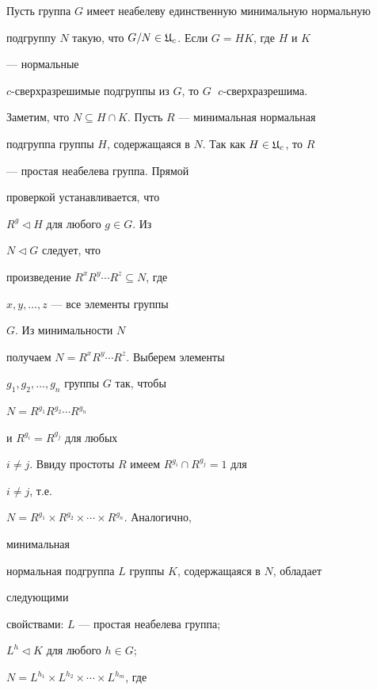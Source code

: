 \begin{lem}


Пусть группа $G$ имеет неабелеву единственную минимальную нормальную


подгруппу $N$ такую, что $G/N\in\frak U_c$. Если $G=HK$, где $H$ и $K$


--- нормальные


$c$-сверхразрешимые подгруппы из $G$, то $G\;$ $c$-сверхразрешима.


\end{lem}





\begin{pf}


Заметим, что $N\subseteq H\cap K$. Пусть $R$ --- минимальная нормальная


подгруппа группы $H$, содержащаяся в $N$. Так как $H\in\frak U_c$, то $R$


--- простая неабелева группа. Прямой


проверкой устанавливается, что


$R^g\vartriangleleft H$ для любого $g\in G$. Из


$N\vartriangleleft G$ следует, что


произведение $R^xR^y\dotsb R^z\subseteq N$, где


$x,y,\dotsc,z$ --- все элементы группы


$G$. Из минимальности $N$


получаем $N=R^xR^y\dotsb R^z$. Выберем элементы


$g_1,g_2,\dotsc,g_n$ группы $G$ так, чтобы


$N=R^{g_1}R^{g_2}\dotsb R^{g_n}$


и $R^{g_i}=R^{g_j}$ для любых


$i\ne j$. Ввиду простоты $R$ имеем $R^{g_i}\cap R^{g_j}=1$ для


$i\ne j$, т.е.


$N=R^{g_1}\times R^{g_2}\times\dotsb\times R^{g_n}$. Аналогично,


минимальная


нормальная подгруппа $L$ группы $K$, содержащаяся в $N$, обладает


следующими


свойствами: $L$ --- простая неабелева группа;


$L^h\vartriangleleft K$ для любого $h\in G$;


$N=L^{h_1}\times L^{h_2}\times\dotsb\times L^{h_m}$, где



\end{pf}
